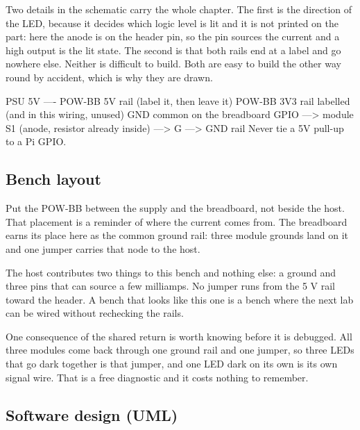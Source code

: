 Two details in the schematic carry the whole chapter. The first is the direction of the LED, because it decides which logic level is lit and it is not printed on the part: here the anode is on the header pin, so the pin sources the current and a high output is the lit state. The second is that both rails end at a label and go nowhere else. Neither is difficult to build. Both are easy to build the other way round by accident, which is why they are drawn.

\begin{asciiart}
PSU 5V ---- POW-BB 5V rail   (label it, then leave it)
POW-BB 3V3 rail labelled     (and in this wiring, unused)
GND common on the breadboard
GPIO ---> module S1 (anode, resistor already inside) ---> G ---> GND rail
Never tie a 5V pull-up to a Pi GPIO.
\end{asciiart}

\subsection*{Bench layout}


Put the POW-BB between the supply and the breadboard, not beside the host. That placement is a reminder of where the current comes from. The breadboard earns its place here as the common ground rail: three module grounds land on it and one jumper carries that node to the host.

The host contributes two things to this bench and nothing else: a ground and three pins that can source a few milliamps. No jumper runs from the 5 V rail toward the header. A bench that looks like this one is a bench where the next lab can be wired without rechecking the rails.

One consequence of the shared return is worth knowing before it is debugged. All three modules come back through one ground rail and one jumper, so three LEDs that go dark together is that jumper, and one LED dark on its own is its own signal wire. That is a free diagnostic and it costs nothing to remember.

\subsection*{Software design (UML)}

